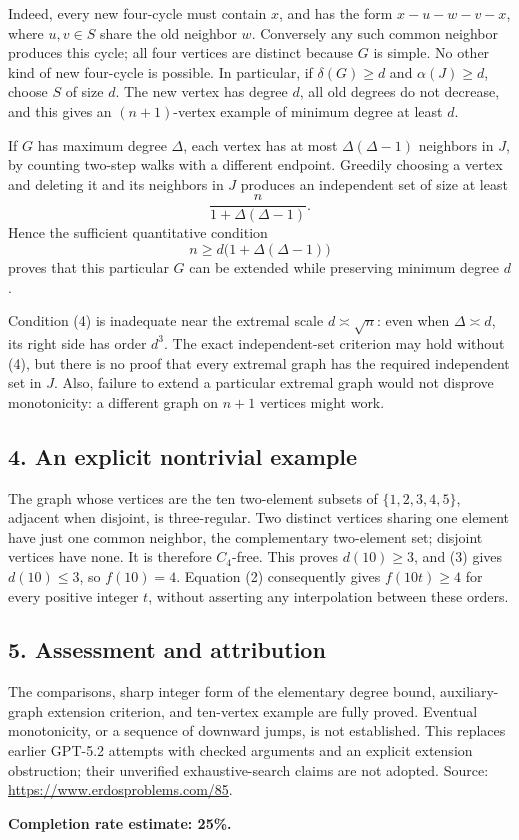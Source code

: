 Indeed, every new four-cycle must contain $x$, and has the form $x-u-w-v-x$, where $u,v\in S$ share the old neighbor $w$. Conversely any such common neighbor produces this cycle; all four vertices are distinct because $G$ is simple. No other kind of new four-cycle is possible. In particular, if $\delta(G)\ge d$ and $\alpha(J)\ge d$, choose $S$ of size $d$. The new vertex has degree $d$, all old degrees do not decrease, and this gives an $(n+1)$-vertex example of minimum degree at least $d$.

If $G$ has maximum degree $\Delta$, each vertex has at most $\Delta(\Delta-1)$ neighbors in $J$, by counting two-step walks with a different endpoint. Greedily choosing a vertex and deleting it and its neighbors in $J$ produces an independent set of size at least
\[
 \frac{n}{1+\Delta(\Delta-1)}.
\]
Hence the sufficient quantitative condition
\[
 n\ge d\bigl(1+\Delta(\Delta-1)\bigr)\tag{4}
\]
proves that this particular $G$ can be extended while preserving minimum degree $d$.

Condition (4) is inadequate near the extremal scale $d\asymp\sqrt n$: even when $\Delta\asymp d$, its right side has order $d^3$. The exact independent-set criterion may hold without (4), but there is no proof that every extremal graph has the required independent set in $J$. Also, failure to extend a particular extremal graph would not disprove monotonicity: a different graph on $n+1$ vertices might work.

\subsection*{4. An explicit nontrivial example}
The graph whose vertices are the ten two-element subsets of $\{1,2,3,4,5\}$, adjacent when disjoint, is three-regular. Two distinct vertices sharing one element have just one common neighbor, the complementary two-element set; disjoint vertices have none. It is therefore $C_4$-free. This proves $d(10)\ge3$, and (3) gives $d(10)\le3$, so $f(10)=4$. Equation (2) consequently gives $f(10t)\ge4$ for every positive integer $t$, without asserting any interpolation between these orders.

\subsection*{5. Assessment and attribution}
The comparisons, sharp integer form of the elementary degree bound, auxiliary-graph extension criterion, and ten-vertex example are fully proved. Eventual monotonicity, or a sequence of downward jumps, is not established. This replaces earlier GPT-5.2 attempts with checked arguments and an explicit extension obstruction; their unverified exhaustive-search claims are not adopted.
Source: \url{https://www.erdosproblems.com/85}.

\textbf{Completion rate estimate: 25\%.}


